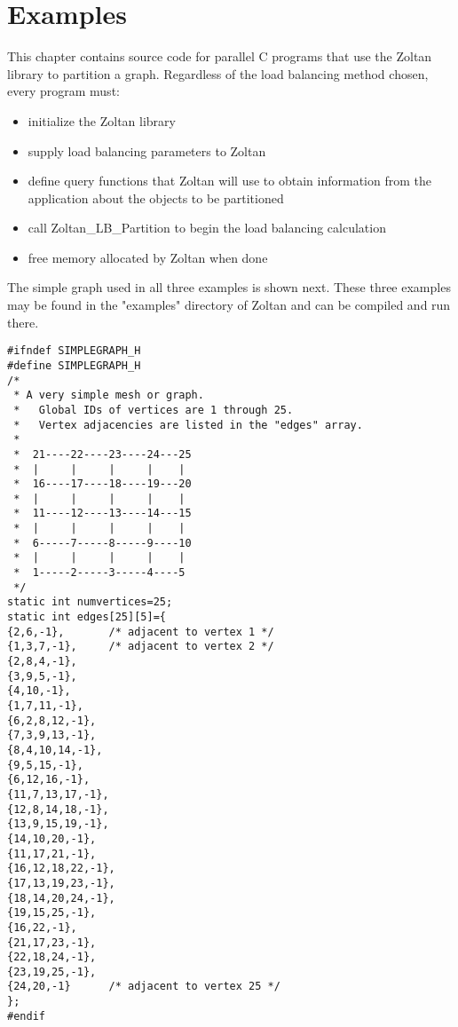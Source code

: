 %
%
\chapter{Examples}

This chapter contains source code for parallel C programs 
that use the
Zoltan library to partition a graph.  Regardless of the load
balancing method chosen, every program must:

\begin{itemize}
\item initialize the Zoltan library
\item supply load balancing parameters to Zoltan
\item define query functions that Zoltan will use to obtain information
from the application about the objects to be partitioned
\item call Zoltan\_LB\_Partition to begin the load balancing calculation
\item free memory allocated by Zoltan when done
\end{itemize}

The simple graph used in all three examples is shown next.
These three examples may be found in the "examples"
directory of Zoltan and can be compiled and run there.

\clearpage

\begin{verbatim}
#ifndef SIMPLEGRAPH_H
#define SIMPLEGRAPH_H
/*
 * A very simple mesh or graph.
 *   Global IDs of vertices are 1 through 25.
 *   Vertex adjacencies are listed in the "edges" array.
 *
 *  21----22----23----24---25
 *  |     |     |     |    |
 *  16----17----18----19---20
 *  |     |     |     |    |
 *  11----12----13----14---15
 *  |     |     |     |    |
 *  6-----7-----8-----9----10
 *  |     |     |     |    |
 *  1-----2-----3-----4----5
 */
static int numvertices=25;
static int edges[25][5]={
{2,6,-1},       /* adjacent to vertex 1 */
{1,3,7,-1},     /* adjacent to vertex 2 */
{2,8,4,-1},
{3,9,5,-1},
{4,10,-1},
{1,7,11,-1},
{6,2,8,12,-1},
{7,3,9,13,-1},
{8,4,10,14,-1},
{9,5,15,-1},
{6,12,16,-1},
{11,7,13,17,-1},
{12,8,14,18,-1},
{13,9,15,19,-1},
{14,10,20,-1},
{11,17,21,-1},
{16,12,18,22,-1},
{17,13,19,23,-1},
{18,14,20,24,-1},
{19,15,25,-1},
{16,22,-1},
{21,17,23,-1},
{22,18,24,-1},
{23,19,25,-1},
{24,20,-1}      /* adjacent to vertex 25 */
};
#endif
\end{verbatim}

